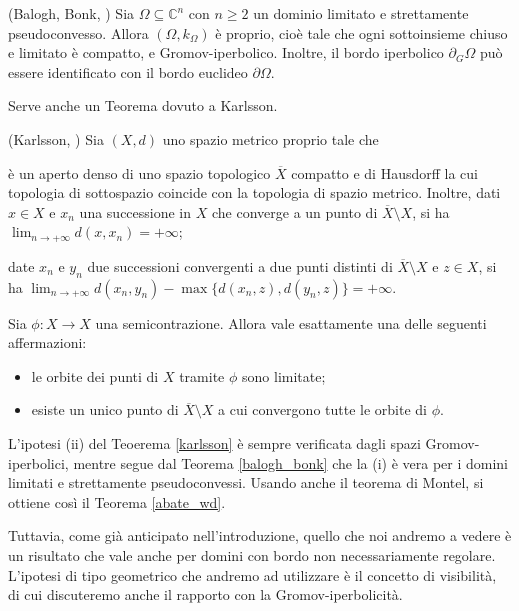 \begin{thm} \label{balogh_bonk}
    (Balogh, Bonk, \cite[Theorem 1.4]{BB}) Sia $\Omega \subseteq \mathbb{C}^n$ con $n \ge 2$ un dominio limitato e strettamente pseudoconvesso. Allora $(\Omega,k_{\Omega})$ è proprio, cioè tale che ogni sottoinsieme chiuso e limitato è compatto, e Gromov-iperbolico. Inoltre, il bordo iperbolico $\partial_G\Omega$ può essere identificato con il bordo euclideo $\partial\Omega$.
\end{thm}

Serve anche un Teorema dovuto a Karlsson.

\begin{thm} \label{karlsson}
    (Karlsson, \cite[Corollary 3.7]{Ka}) Sia $(X,d)$ uno spazio metrico proprio tale che
    \begin{nlist}
        \item è un aperto denso di uno spazio topologico $\overline{X}$ compatto e di Hausdorff la cui topologia di sottospazio coincide con la topologia di spazio metrico. Inoltre, dati $x \in X$ e $x_n$ una successione in $X$ che converge a un punto di $\overline{X}\setminus X$, si ha $\displaystyle\lim_{n\longrightarrow+\infty}d(x,x_n)=+\infty$;
        \item date $x_n$ e $y_n$ due successioni convergenti a due punti distinti di $\overline{X}\setminus X$ e $z \in X$, si ha $\displaystyle\lim_{n\longrightarrow+\infty} d(x_n,y_n)-\max\{d(x_n,z),d(y_n,z)\}=+\infty$.
    \end{nlist}
    Sia $\phi:X \longrightarrow X$ una semicontrazione. Allora vale esattamente una delle seguenti affermazioni:
    \begin{itemize}
        \item le orbite dei punti di $X$ tramite $\phi$ sono limitate;
        \item esiste un unico punto di $\overline{X}\setminus X$ a cui convergono tutte le orbite di $\phi$.
    \end{itemize}
\end{thm}

L'ipotesi (ii) del Teoerema \ref{karlsson} è sempre verificata dagli spazi Gromov-iperbolici, mentre segue dal Teorema \ref{balogh_bonk} che la (i) è vera per i domini limitati e strettamente pseudoconvessi. Usando anche il teorema di Montel, si ottiene così il Teorema \ref{abate_wd}.

Tuttavia, come già anticipato nell'introduzione, quello che noi andremo a vedere è un risultato che vale anche per domini con bordo non necessariamente regolare. L'ipotesi di tipo geometrico che andremo ad utilizzare è il concetto di visibilità, di cui discuteremo anche il rapporto con la Gromov-iperbolicità.